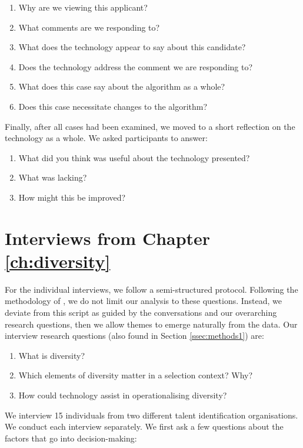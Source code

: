 \begin{enumerate}
    \item Why are we viewing this applicant?
    \item What comments are we responding to?
    \item What does the technology appear to say about this candidate?
    \item Does the technology address the comment we are responding to?
    \item What does this case say about the algorithm as a whole?
    \item Does this case necessitate changes to the algorithm?
\end{enumerate}

Finally, after all cases had been examined, we moved to a short reflection on the technology as a whole. We asked participants to answer:

\begin{enumerate}
    \item What did you think was useful about the technology presented?
    \item What was lacking?
    \item How might this be improved?
\end{enumerate}


\section{Interviews from Chapter \ref{ch:diversity}}\label{app:divprotocol1}
For the individual interviews, we follow a semi-structured protocol. Following the methodology of \textcite{braun_using_2006}, we do not limit our analysis to these questions. Instead, we deviate from this script as guided by the conversations and our overarching research questions, then we allow themes to emerge naturally from the data. Our interview research questions (also found in Section \ref{ssec:methods1}) are:

\begin{enumerate}
    \item What is diversity?
    \item Which elements of diversity matter in a selection context? Why?
    \item How could technology assist in operationalising diversity?
\end{enumerate}

We interview 15 individuals from two different talent identification organisations. We conduct each interview separately. We first ask a few questions about the factors that go into decision-making:

